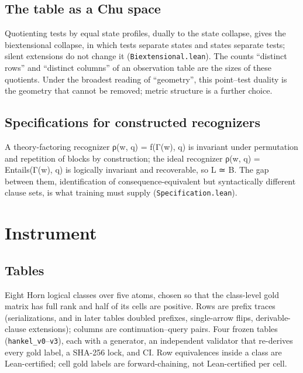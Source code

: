 \hypertarget{the-table-as-a-chu-space}{%
\subsection{The table as a Chu
space}\label{the-table-as-a-chu-space}}

Quotienting tests by equal state profiles, dually to the state collapse,
gives the biextensional collapse, in which tests separate states and
states separate tests; silent extensions do not change it
(\texttt{Biextensional.lean}). The counts ``distinct rows'' and
``distinct columns'' of an observation table are the sizes of these
quotients. Under the broadest reading of ``geometry'', this point--test
duality is the geometry that cannot be removed; metric structure is a
further choice.

\hypertarget{specifications-for-constructed-recognizers}{%
\subsection{Specifications for constructed
recognizers}\label{specifications-for-constructed-recognizers}}

A theory-factoring recognizer ρ(w, q) = f(Γ(w), q) is invariant under
permutation and repetition of blocks by construction; the ideal
recognizer ρ(w, q) = Entails(Γ(w), q) is logically invariant and
recoverable, so L ≃ B. The gap between them, identification of
consequence-equivalent but syntactically different clause sets, is what
training must supply (\texttt{Specification.lean}).

\hypertarget{instrument}{%
\section{Instrument}\label{instrument}}

\hypertarget{tables}{%
\subsection{Tables}\label{tables}}

Eight Horn logical classes over five atoms, chosen so that the
class-level gold matrix has full rank and half of its cells are
positive. Rows are prefix traces (serializations, and in later tables
doubled prefixes, single-arrow flips, derivable-clause extensions);
columns are continuation--query pairs. Four frozen tables
(\texttt{hankel\_v0}--\texttt{v3}), each with a generator, an
independent validator that re-derives every gold label, a SHA-256 lock,
and CI. Row equivalences inside a class are Lean-certified; cell gold
labels are forward-chaining, not Lean-certified per cell.

